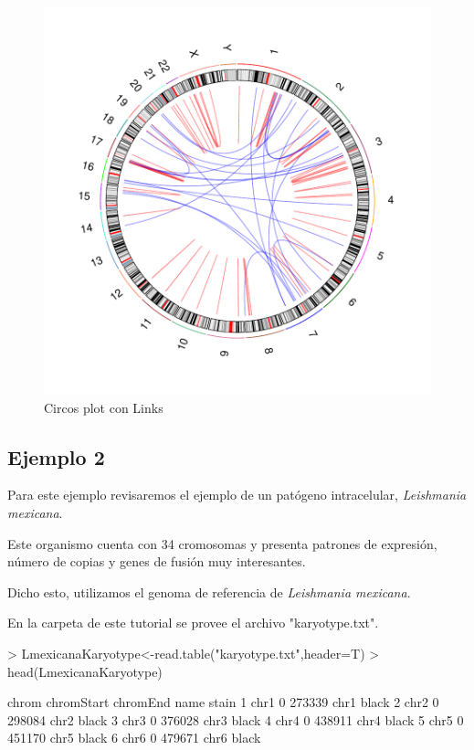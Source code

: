 \documentclass[a4paper,spanish]{article}
\begin{document}
\begin{figure}[H]
\centering
\includegraphics{plot-015}
\caption{Circos plot con Links}
\end{figure}

\subsection{Ejemplo 2}

Para este ejemplo revisaremos el ejemplo de un patógeno intracelular, \textit{Leishmania mexicana}. 

Este organismo cuenta con 34 cromosomas y presenta patrones de expresión, número de copias y genes de fusión muy interesantes.

Dicho esto, utilizamos el genoma de referencia de \textit{Leishmania mexicana}.

En la carpeta de este tutorial se provee el archivo "karyotype.txt".

\begin{Schunk}
\begin{Sinput}
> LmexicanaKaryotype<-read.table("karyotype.txt",header=T)
> head(LmexicanaKaryotype)
\end{Sinput}
\begin{Soutput}
  chrom chromStart chromEnd name stain
1  chr1          0   273339 chr1 black
2  chr2          0   298084 chr2 black
3  chr3          0   376028 chr3 black
4  chr4          0   438911 chr4 black
5  chr5          0   451170 chr5 black
6  chr6          0   479671 chr6 black
\end{Soutput}
\end{Schunk}
\end{document}
